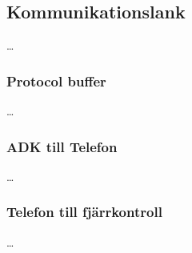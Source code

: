 \subsection{Kommunikationslank}
\ldots
\subsubsection{Protocol buffer}
\ldots
\subsubsection{ADK till Telefon}
\ldots
\subsubsection{Telefon till fjärrkontroll}
\ldots
